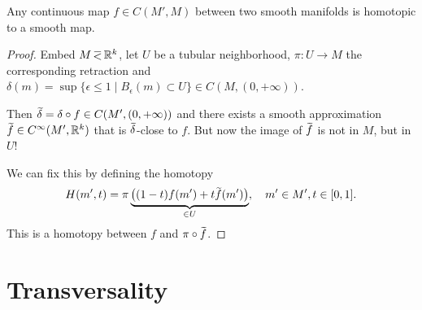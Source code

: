 \begin{thm}\label{thm whitney approx}
Any continuous map $f\in C(M',M)$ between two smooth manifolds is homotopic to a smooth map.
\end{thm}
\begin{proof}
Embed $M\emb \bbR^k$, let $U$ be a tubular neighborhood, $\pi:U\to M$ the corresponding retraction and $\delta(m)=\sup \{\epsilon\leq 1\mid B_\epsilon (m)\subset U\}\in C(M,(0,+\infty))$. 

Then $\wt{\delta}=\delta\circ f\in C(M',(0,+\infty))$ and there exists a smooth approximation $\wt{f}\in C^\infty(M',\bbR^k)$ that is $\wt{\delta}$-close to $f$. But now the image of $\wt{f}$ is not in $M$, but in $U$!

We can fix this by defining the homotopy 
\[H(m',t)=\pi\underbrace{\left((1-t)f(m')+t\wt{f}(m')\right)}_{\in U},\quad m'\in M',t\in [0,1].\] This is a homotopy between $f$ and $\pi\circ\wt{f}$.
\end{proof}





\section{Transversality}

